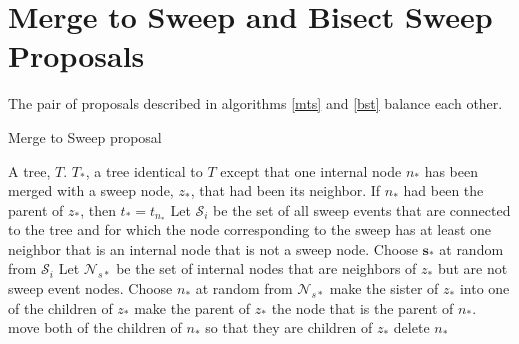 \documentclass[letterpaper]{article}
\newcommand{\sweep}[1]{{\ensuremath{\mathbf{s}_{#1}}}}
\newcommand{\sweeptime}[1]{{\ensuremath{t_{#1}}}}
\newcommand{\sweeploc}[1]{{\ensuremath{z_{#1}}}}
\newcommand{\internalConnectedSweepSet}{{\ensuremath{\mathcal{S}_i}}}
\begin{document}
\section{Merge to Sweep and Bisect Sweep Proposals}
The pair of proposals described in algorithms \ref{mts} and \ref{bst} balance each other. 

\begin{algorithm} 
\caption{Merge to Sweep proposal}
\label{mts}
\begin{algorithmic}[1]
	\REQUIRE A tree, $T$.
	\ENSURE $T_*$, a tree identical to $T$ except that one internal node $n_*$ has been merged with a sweep node, $\sweeploc{*}$, that had been its neighbor. If $n_*$ had been the parent of $\sweeploc{*}$, then $\sweeptime{*} = t_{n_*}$
	\STATE Let $\internalConnectedSweepSet$ be the set of all sweep events that are connected to the tree and for which the node corresponding to the sweep has at least one neighbor that is an internal node that is not a sweep node. 
	\IF{$\internalConnectedSweepSet = \emptyset$}
	\ENDIF
	\STATE Choose $\sweep{*}$ at random from $\internalConnectedSweepSet$
	\STATE Let $\mathcal{N}_{s*}$ be the set of internal nodes that are neighbors of  $\sweeploc{*}$ but are not sweep event nodes.
	\STATE Choose $n_*$ at random from $\mathcal{N}_{s*}$
	\IF{$n_*$ is the parent of $\sweeploc{*}$}
		\STATE make the sister of $\sweeploc{*}$ into one of the children of $\sweeploc{*}$
		\STATE make the parent of $\sweeploc{*}$ the node that is the parent of $n_*$.
	\ELSE
		\STATE  move both of the children of $n_*$ so that they are children of $\sweeploc{*}$
	\ENDIF
	\STATE delete $n_*$
\end{algorithmic}
\end{algorithm} 
\end{document}
